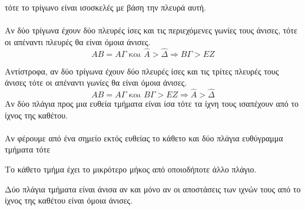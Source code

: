 \documentclass[twoside,nofonts,ektypwsh,shmeiwseis]{thewria}
\begin{document}
τότε το τρίγωνο είναι ισοσκελές με βάση την πλευρά αυτή.\\\\
Αν δύο τρίγωνα έχουν δύο πλευρές ίσες και τις περιεχόμενες γωνίες τους άνισες, τότε οι απέναντι πλευρές θα είναι όμοια άνισες.
\[ AB=A\varGamma\textrm{ και }\hat{A}>\hat{\varDelta}\Rightarrow B\varGamma>EZ \]
\begin{center}
\end{center}
Αντίστροφα, αν δύο τρίγωνα έχουν δύο πλευρές ίσες και τις τρίτες πλευρές τους άνισες τότε οι απέναντι γωνίες θα είναι όμοια άνισες.
\[ AB=A\varGamma\textrm{ και }B\varGamma>EZ \Rightarrow \hat{A}>\hat{\varDelta} \]
Αν δύο πλάγια προς μια ευθεία τμήματα είναι ίσα τότε τα ίχνη τους ισαπέχουν από το ίχνος της καθέτου.\\\\
Αν φέρουμε από ένα σημείο εκτός ευθείας το κάθετο και δύο πλάγια ευθύγραμμα τμήματα τότε
\begin{rlist}
\item Το κάθετο τμήμα έχει το μικρότερο μήκος από οποιοδήποτε άλλο πλάγιο.
\item Δύο πλάγια τμήματα είναι άνισα αν και μόνο αν οι αποστάσεις των ιχνών τους από το ίχνος της καθέτου είναι όμοια άνισες.
\end{rlist}
\end{document}

